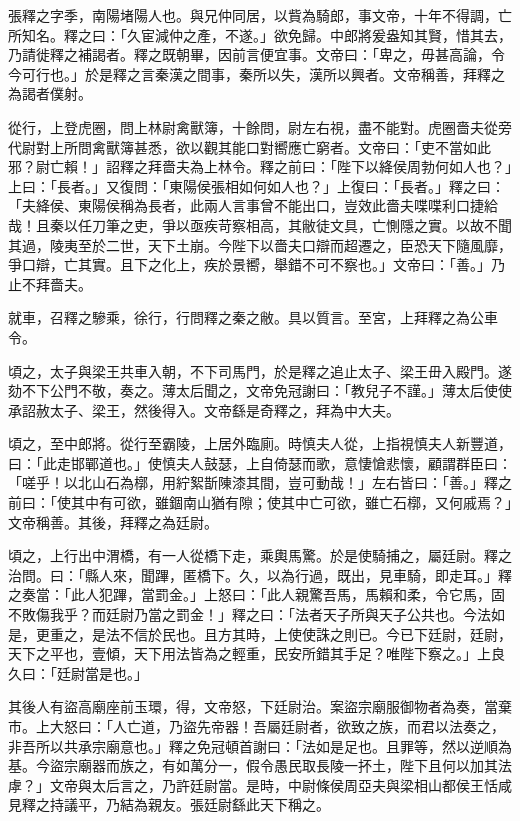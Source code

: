 
\begin{pinyinscope}
張釋之字季，南陽堵陽人也。與兄仲同居，以貲為騎郎，事文帝，十年不得調，亡所知名。釋之曰：「久宦減仲之產，不遂。」欲免歸。中郎將爰盎知其賢，惜其去，乃請徙釋之補謁者。釋之既朝畢，因前言便宜事。文帝曰：「卑之，毋甚高論，令今可行也。」於是釋之言秦漢之間事，秦所以失，漢所以興者。文帝稱善，拜釋之為謁者僕射。

從行，上登虎圈，問上林尉禽獸簿，十餘問，尉左右視，盡不能對。虎圈嗇夫從旁代尉對上所問禽獸簿甚悉，欲以觀其能口對嚮應亡窮者。文帝曰：「吏不當如此邪？尉亡賴！」詔釋之拜嗇夫為上林令。釋之前曰：「陛下以絳侯周勃何如人也？」上曰：「長者。」又復問：「東陽侯張相如何如人也？」上復曰：「長者。」釋之曰：「夫絳侯、東陽侯稱為長者，此兩人言事曾不能出口，豈效此嗇夫喋喋利口捷給哉！且秦以任刀筆之吏，爭以亟疾苛察相高，其敝徒文具，亡惻隱之實。以故不聞其過，陵夷至於二世，天下土崩。今陛下以嗇夫口辯而超遷之，臣恐天下隨風靡，爭口辯，亡其實。且下之化上，疾於景嚮，舉錯不可不察也。」文帝曰：「善。」乃止不拜嗇夫。

就車，召釋之驂乘，徐行，行問釋之秦之敝。具以質言。至宮，上拜釋之為公車令。

頃之，太子與梁王共車入朝，不下司馬門，於是釋之追止太子、梁王毌入殿門。遂劾不下公門不敬，奏之。薄太后聞之，文帝免冠謝曰：「教兒子不謹。」薄太后使使承詔赦太子、梁王，然後得入。文帝繇是奇釋之，拜為中大夫。

頃之，至中郎將。從行至霸陵，上居外臨廁。時慎夫人從，上指視慎夫人新豐道，曰：「此走邯鄲道也。」使慎夫人鼓瑟，上自倚瑟而歌，意悽愴悲懷，顧謂群臣曰：「嗟乎！以北山石為槨，用紵絮斮陳漆其間，豈可動哉！」左右皆曰：「善。」釋之前曰：「使其中有可欲，雖錮南山猶有隙；使其中亡可欲，雖亡石槨，又何戚焉？」文帝稱善。其後，拜釋之為廷尉。

頃之，上行出中渭橋，有一人從橋下走，乘輿馬驚。於是使騎捕之，屬廷尉。釋之治問。曰：「縣人來，聞蹕，匿橋下。久，以為行過，既出，見車騎，即走耳。」釋之奏當：「此人犯蹕，當罰金。」上怒曰：「此人親驚吾馬，馬賴和柔，令它馬，固不敗傷我乎？而廷尉乃當之罰金！」釋之曰：「法者天子所與天子公共也。今法如是，更重之，是法不信於民也。且方其時，上使使誅之則已。今已下廷尉，廷尉，天下之平也，壹傾，天下用法皆為之輕重，民安所錯其手足？唯陛下察之。」上良久曰：「廷尉當是也。」

其後人有盜高廟座前玉環，得，文帝怒，下廷尉治。案盜宗廟服御物者為奏，當棄市。上大怒曰：「人亡道，乃盜先帝器！吾屬廷尉者，欲致之族，而君以法奏之，非吾所以共承宗廟意也。」釋之免冠頓首謝曰：「法如是足也。且罪等，然以逆順為基。今盜宗廟器而族之，有如萬分一，假令愚民取長陵一抔土，陛下且何以加其法虖？」文帝與太后言之，乃許廷尉當。是時，中尉條侯周亞夫與梁相山都侯王恬咸見釋之持議平，乃結為親友。張廷尉繇此天下稱之。


\end{pinyinscope}
